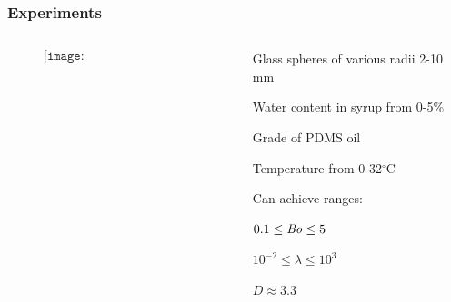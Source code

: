 \documentclass{beamer}
\newcommand\Bo{\mbox{\textit{Bo}}}  %
\begin{document}
\begin{frame}
  \frametitle{Experiments}

  \begin{columns}

    \begin{column}{0.5\paperwidth}
      \vspace{-1cm}

      \begin{figure}
        $$\texttt{[image: tank\_labelled.png]}$$
      \end{figure}

    \end{column}

    \begin{column}{0.5\paperwidth}
      \centering

      Glass spheres of various radii 2-10 mm \\

      \vspace{0.5cm}

      Water content in syrup from 0-5\% \\

      \vspace{0.5cm}

      Grade of PDMS oil \\

      \vspace{0.5cm}

      Temperature from 0-32$^{\circ}$C \\

      \vspace{1cm}

      Can achieve ranges: \\

      \vspace{0.5cm}

      $0.1 \leq \Bo \leq 5$ \\

      \vspace{0.5cm}

      $10^{-2} \leq \lambda \leq 10^{3}$ \\
 
      \vspace{0.5cm}

      $D \approx 3.3$ \\
    \end{column}

  \end{columns}
\end{frame}
\end{document}
